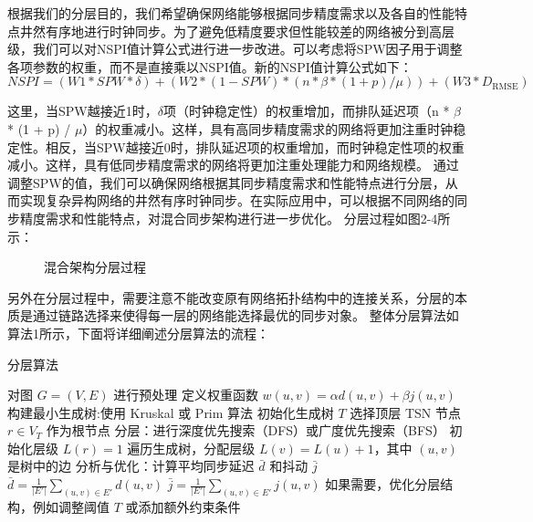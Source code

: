 \documentclass[UTF8,a4paper,12pt]{ctexart}
\numberwithin{equation}{section}
\begin{document}
根据我们的分层目的，我们希望确保网络能够根据同步精度需求以及各自的性能特点井然有序地进行时钟同步。为了避免低精度要求但性能较差的网络被分到高层级，我们可以对NSPI值计算公式进行进一步改进。可以考虑将SPW因子用于调整各项参数的权重，而不是直接乘以NSPI值。新的NSPI值计算公式如下：
\begin{equation}
	NSPI = (W1 * SPW * \delta) + (W2 * (1 - SPW) * (n * \beta * (1 + p) / \mu)) + (W3 * D_{\text{RMSE}})
\end{equation}

这里，当SPW越接近1时，$\delta$项（时钟稳定性）的权重增加，而排队延迟项（n * $\beta$ * (1 + p) / $\mu$）的权重减小。这样，具有高同步精度需求的网络将更加注重时钟稳定性。相反，当SPW越接近0时，排队延迟项的权重增加，而时钟稳定性项的权重减小。这样，具有低同步精度需求的网络将更加注重处理能力和网络规模。
通过调整SPW的值，我们可以确保网络根据其同步精度需求和性能特点进行分层，从而实现复杂异构网络的井然有序时钟同步。在实际应用中，可以根据不同网络的同步精度需求和性能特点，对混合同步架构进行进一步优化。
分层过程如图2-4所示：

\begin{figure}[htb]
	\caption{\label{1} 混合架构分层过程}
\end{figure}

另外在分层过程中，需要注意不能改变原有网络拓扑结构中的连接关系，分层的本质是通过链路选择来使得每一层的网络能选择最优的同步对象。
整体分层算法如算法1所示，下面将详细阐述分层算法的流程：
\begin{algorithm}
	\caption{分层算法}
	\begin{algorithmic}[1]
		\STATE 对图 $G=(V,E)$ 进行预处理
		\STATE 定义权重函数 $w(u, v) = \alpha d(u, v) + \beta j(u, v)$
		\STATE 构建最小生成树:使用 Kruskal 或 Prim 算法
		\STATE 初始化生成树 $T$
		\STATE 选择顶层 TSN 节点 $r \in V_T$ 作为根节点
		\STATE 分层：进行深度优先搜索（DFS）或广度优先搜索（BFS）
		\STATE 初始化层级 $L(r) = 1$
		\STATE 遍历生成树，分配层级 $L(v) = L(u) + 1$，其中 $(u, v)$ 是树中的边
		\STATE 分析与优化：计算平均同步延迟 $\bar{d}$ 和抖动 $\bar{j}$
		\STATE $\bar{d} = \frac{1}{\lvert E' \rvert} \sum_{(u,v) \in E'} d(u,v)$
		\STATE $\bar{j} = \frac{1}{\lvert E' \rvert} \sum_{(u,v) \in E'} j(u,v)$
		\STATE 如果需要，优化分层结构，例如调整阈值 $T$ 或添加额外约束条件
	\end{algorithmic}
\end{algorithm}
\end{document}
